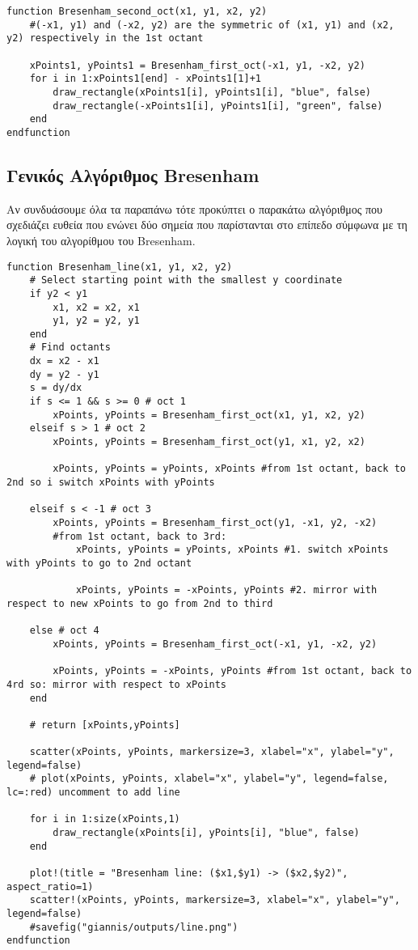 \begin{lstlisting}[caption={Bresenham Line Algorithm for 4th Octant}]
function Bresenham_second_oct(x1, y1, x2, y2) 
	#(-x1, y1) and (-x2, y2) are the symmetric of (x1, y1) and (x2, y2) respectively in the 1st octant
	
	xPoints1, yPoints1 = Bresenham_first_oct(-x1, y1, -x2, y2)  
    for i in 1:xPoints1[end] - xPoints1[1]+1
        draw_rectangle(xPoints1[i], yPoints1[i], "blue", false)
		draw_rectangle(-xPoints1[i], yPoints1[i], "green", false)        
    end
endfunction    
\end{lstlisting}

\subsection{Γενικός Αλγόριθμος Bresenham}
	Αν συνδυάσουμε όλα τα παραπάνω τότε προκύπτει ο παρακάτω αλγόριθμος που σχεδιάζει ευθεία που ενώνει δύο σημεία που παρίστανται στο επίπεδο σύμφωνα με τη λογική του αλγορίθμου του Bresenham.
	
	
\begin{lstlisting}[caption={General Bresenham Line Algorithm}]
function Bresenham_line(x1, y1, x2, y2)
	# Select starting point with the smallest y coordinate
    if y2 < y1
        x1, x2 = x2, x1
        y1, y2 = y2, y1
    end       
	# Find octants
    dx = x2 - x1
    dy = y2 - y1
    s = dy/dx
    if s <= 1 && s >= 0 # oct 1
        xPoints, yPoints = Bresenham_first_oct(x1, y1, x2, y2)  
    elseif s > 1 # oct 2
        xPoints, yPoints = Bresenham_first_oct(y1, x1, y2, x2) 
        
        xPoints, yPoints = yPoints, xPoints #from 1st octant, back to 2nd so i switch xPoints with yPoints

    elseif s < -1 # oct 3
        xPoints, yPoints = Bresenham_first_oct(y1, -x1, y2, -x2) 
        #from 1st octant, back to 3rd: 
            xPoints, yPoints = yPoints, xPoints #1. switch xPoints with yPoints to go to 2nd octant 
            
            xPoints, yPoints = -xPoints, yPoints #2. mirror with respect to new xPoints to go from 2nd to third

    else # oct 4
        xPoints, yPoints = Bresenham_first_oct(-x1, y1, -x2, y2)
        
        xPoints, yPoints = -xPoints, yPoints #from 1st octant, back to 4rd so: mirror with respect to xPoints 
    end
    
    # return [xPoints,yPoints]

    scatter(xPoints, yPoints, markersize=3, xlabel="x", ylabel="y", legend=false)
    # plot(xPoints, yPoints, xlabel="x", ylabel="y", legend=false, lc=:red) uncomment to add line

    for i in 1:size(xPoints,1)
        draw_rectangle(xPoints[i], yPoints[i], "blue", false)
    end

    plot!(title = "Bresenham line: ($x1,$y1) -> ($x2,$y2)", aspect_ratio=1)
    scatter!(xPoints, yPoints, markersize=3, xlabel="x", ylabel="y", legend=false)
    #savefig("giannis/outputs/line.png")   
endfunction
\end{lstlisting}	